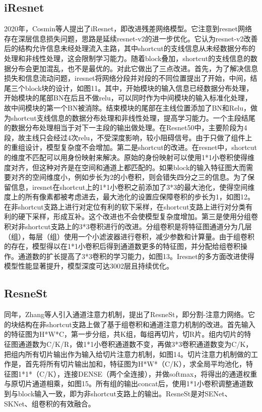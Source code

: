\documentclass[15pt]{article}
\begin{document}
\subsection{iResnet}
2020年，Cosmin等人提出了iResnet，即改进残差网络模型\cite{ref68}。它注意到resnet网络存在深层信息损失问题，思路是延续resnet-v2的进一步优化。它认为resnet-v2改善后的结构允许信息未经处理流入主路，其中shortcut的支线信息从未经数据分布的处理和非线性处理，这会限制学习能力。随着block叠加，shortcut的支线信息的数据分布会更加混乱，也不是最优的。对此它做出了三点改进。首先，为了解决信息损失和信息流动问题，iresnet将网络分段并对段的不同位置提出了开始，中间，结尾三个block块的设计，如图11。其中，开始模块的输入信息已经数据分布处理，开始模块的尾部BN在后且不做relu，可以同时作为中间模块的输入标准化处理，故中间模块的第一个BN被消除。结束模块的尾部在主线位置添加了BN和Relu，做为shortcut支线信息的数据分布处理和非线性处理，提高学习能力。一个主段结尾的数据分布处理相当于对下一主段的输出做处理。在Resnet50中，主要阶段为4段，故主线只会经过4次relu，不受深度影响，较小阻碍信号。由于只做了组件上的重组设计，模型复杂度不会增加。第二是shortcut的改进。在resnet中，shortcut的维度不匹配可以用身份映射来解决。原始的身份映射可以使用1*1小卷积使得维度对齐，但这种对齐是在空间和通道上都匹配的。如果block的输入特征图大而需要对齐的空间维度小，例如步长为2的小卷积，则会错失四分之三的信息。为了保留信息，iresnet在shortcut上的1*1小卷积之前添加了3*3的最大池化，使得空间维度上的所有像素都被考虑进去，最大池化的设置应保障卷积的步长为1，如图12。在非shortcut支路上进行对定位有利的软下采样，在shortcut支路上进行对分类有利的硬下采样，形成互补。这个改进也不会使模型复杂度增加。第三是使用分组卷积\cite{ref38}\cite{ref56}\cite{ref57}\cite{ref69}对非shortcut支路上的3*3卷积进行的改进。分组卷积是将特征图通道分为几层（组），每层（组）使用一个小滤波器进行卷积，减少参数和计算量。由于组卷积的存在，模型得以在1*1小卷积后得到通道数更多的特征图，并分配给组卷积操作。通道数的扩长提高了3*3卷积的学习能力，如图13。Iresnet的多方面改进使得模型性能显著提升，模型深度可达3002层且持续优化。

\subsection{ResneSt}
同年，Zhang等人引入通道注意力机制，提出了ResneSt，即分割-注意力网络\cite{ref70}。它的块结构在非shortcut支路上做了基于组卷积和通道注意力机制的改进。首先输入的特征图为H*W*C，第一步分组，共K组，每组再切片，切R片。组内切片的特征图通道数为C/K/R，做1*1小卷积通道数不变，再做3*3卷积通道数变为C/K，把组内所有切片输出作为输入给切片注意力机制，如图14。切片注意力机制做的工作是，首先将所有切片输出加和，特征图为H*W*（C/K），求全局平均池化，特征图1*1*（C/K），连接DENSE（两个全连接），并做softmax，将得出的通道权重与原切片通道相乘，如图15。所有组的输出concat后，使用1*1小卷积调整通道数到与block输入一致，即为非shortcut支路上的输出。ResneSt是对SENet\cite{ref71}、SKNet\cite{ref72}、组卷积\cite{ref56}的有效融合。
\end{document}
